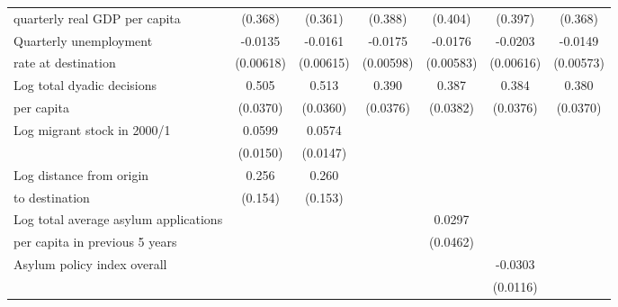 \begin{table}[!ht]
\begin{tabular}{l*{6}{c}}
 quarterly real GDP per capita            &     (0.368)         &     (0.361)         &     (0.388)         &     (0.404)         &     (0.397)         &     (0.368)         \\
[0,5em]
Quarterly unemployment&     -0.0135\sym{*}  &     -0.0161\sym{*}  &     -0.0175\sym{**} &     -0.0176\sym{**} &     -0.0203\sym{**} &     -0.0149\sym{*}  \\
 rate at destination            &   (0.00618)         &   (0.00615)         &   (0.00598)         &   (0.00583)         &   (0.00616)         &   (0.00573)         \\
[0,5em]
Log total dyadic decisions &       0.505\sym{***}&       0.513\sym{***}&       0.390\sym{***}&       0.387\sym{***}&       0.384\sym{***}&       0.380\sym{***}\\
 per capita           &    (0.0370)         &    (0.0360)         &    (0.0376)         &    (0.0382)         &    (0.0376)         &    (0.0370)         \\
[0,5em]
Log migrant stock in 2000/1&      0.0599\sym{***}&      0.0574\sym{***}&                     &                     &                     &                     \\
                    &    (0.0150)         &    (0.0147)         &                     &                     &                     &                     \\
[0,5em]
Log distance from origin&       0.256         &       0.260         &                     &                     &                     &                     \\
 to destination           &     (0.154)         &     (0.153)         &                     &                     &                     &                     \\
[0,5em]
Log total average asylum applications &                     &                     &                     &      0.0297         &                     &                     \\
per capita in previous 5 years            &                     &                     &                     &    (0.0462)         &                     &                     \\
[0,5em]
Asylum policy index overall&                     &                     &                     &                     &     -0.0303\sym{*}  &                     \\
                    &                     &                     &                     &                     &    (0.0116)         &                     \\

\end{tabular}
\end{table}
